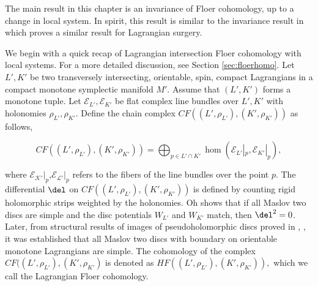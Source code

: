 The main result in this chapter is an invariance of Floer cohomology, up to a change in local system. In spirit, this result is similar to the invariance result in \cite{palmerwoodwardsurg} which proves a similar result for Lagrangian surgery.

We begin with a quick recap of Lagrangian intersection Floer cohomology with local systems. For a more detailed discussion, see Section \ref{sec:floerhomo}. Let $L',K'$ be two transversely intersecting, orientable, spin, compact Lagrangians in a compact monotone symplectic manifold $M'$. Assume that $(L',K')$ forms a monotone tuple.  Let $\mathcal{E}_{L'}, \mathcal{E}_{K'}$ be flat complex line bundles over ${L'}, {K'}$ with holonomies $\rho_{L'}, \rho_{K'} $.  Define the chain complex  $CF({({L'}, \rho_{L'})},  ({K'}, \rho_{K'}))$ as follows, 

\begin{equation*}
    CF({({L'}, \rho_{L'})},  ({K'}, \rho_{K'})) = \bigoplus_{p\in {L'} \cap {K'}} \hom(\mathcal{E}_{{L'}}|_p, \mathcal{E}_{{K'}}|_p ),
\end{equation*}

\noindent  where $\mathcal{E_{K'}}|_p$,$\mathcal{E_{L'}}|_p$ refers to the fibers of the line bundles over the point $p$. The differential $\del$  on $CF({({L'}, \rho_{L'})},  ({K'}, \rho_{K'}))$ is defined by counting rigid holomorphic strips weighted by the holonomies.  Oh \cite{oh:addendum} shows that if all Maslov two discs are simple and the disc potentials $W_{L'}$ and $W_{K'}$ match,  then $\del^2 = 0$.  Later, from structural results of images of pseudoholomorphic discs proved in \cite{kwonoh:sturc}, \cite{Lazz}, it was established that all Maslov two discs with boundary on orientable monotone Lagrangians are simple.  The cohomology of the complex $CF(({L'}, \rho_{L'}), ({K'}, \rho_{K'})$ is denoted as $HF(({L'}, \rho_{L'}), ({K'}, \rho_{K'})),$ which we call the Lagrangian Floer cohomology.   

